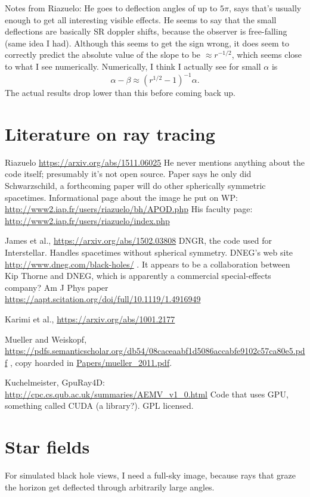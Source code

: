 \documentclass{article}
\begin{document}
Notes from Riazuelo: He goes to deflection angles of up to $5\pi$, says that's usually enough to
get all interesting visible effects. He seems to say that the small deflections are basically
SR doppler shifts, because the observer is free-falling (same idea I had). Although this seems to get the sign
wrong, it does seem to correctly predict the absolute value of the slope to be $\approx r^{-1/2}$,
which seems close to what I see numerically. Numerically, I think I actually see for
small $\alpha$ is
\begin{equation*}
  \alpha-\beta\approx (r^{1/2}-1)^{-1}\alpha.
\end{equation*}
The actual results drop lower than this before coming back up.

\section{Literature on ray tracing}

Riazuelo
\url{https://arxiv.org/abs/1511.06025} He never mentions anything about the code itself; presumably
it's not open source. Paper says he only did Schwarzschild, a forthcoming paper will
do other spherically symmetric spacetimes.
Informational page about the image he put on WP: \url{http://www2.iap.fr/users/riazuelo/bh/APOD.php}
His faculty page: \url{http://www2.iap.fr/users/riazuelo/index.php}

James et al., \url{https://arxiv.org/abs/1502.03808} DNGR, the code used for Interstellar.
Handles spacetimes without spherical symmetry. DNEG's web site
\url{http://www.dneg.com/black-holes/} . It appears to be a collaboration between Kip Thorne and
DNEG, which is apparently a commercial special-effects company?
Am J Phys paper \url{https://aapt.scitation.org/doi/full/10.1119/1.4916949}

Karimi et al., \url{https://arxiv.org/abs/1001.2177}

Mueller and Weiskopf, \url{https://pdfs.semanticscholar.org/db54/08caceaabf1d5086accabfe9102c57ca80e5.pdf} ,
copy hoarded in \url{Papers/mueller_2011.pdf}.

Kuchelmeister, GpuRay4D: \url{http://cpc.cs.qub.ac.uk/summaries/AEMV_v1_0.html}
Code that uses GPU, something called CUDA (a library?). GPL licensed.

\section{Star fields}

For simulated black hole views, I need a full-sky image, because rays that graze the horizon
get deflected through arbitrarily large angles.
\end{document}
